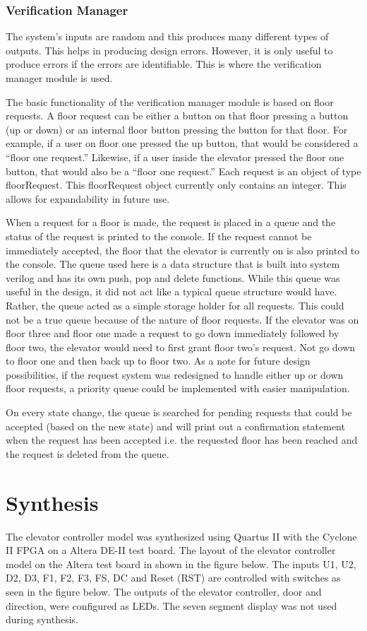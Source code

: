 \documentclass[journal]{IEEEtran}
\begin{document}
\subsubsection{Verification Manager}
The system’s inputs are random and this produces many different types of outputs. This helps in producing design errors. However, it is only useful to produce errors if the errors are identifiable. This is where the verification manager module is used.

The basic functionality of the verification manager module is based on floor requests. A floor request can be either a button on that floor pressing a button (up or down) or an internal floor button pressing the button for that floor. For example, if a user on floor one pressed the up button, that would be considered a “floor one request.” Likewise, if a user inside the elevator pressed the floor one button, that would also be a “floor one request.” Each request is an object of type floorRequest. This floorRequest object currently only contains an integer. This allows for expandability in future use.

When a request for a floor is made, the request is placed in a queue and the status of the request is printed to the console. If the request cannot be immediately accepted, the floor that the elevator is currently on is also printed to the console. The queue used here is a data structure that is built into system verilog and has its own push, pop and delete functions. While this queue was useful in the design, it did not act like a typical queue structure would have. Rather, the queue acted as a simple storage holder for all requests. This could not be a true queue because of the nature of floor requests. If the elevator was on floor three and floor one made a request to go down immediately followed by floor two, the elevator would need to first grant floor two’s request. Not go down to floor one and then back up to floor two. As a note for future design possibilities, if the request system was redesigned to handle either up or down floor requests, a priority queue could be implemented with easier manipulation.

On every state change, the queue is searched for pending requests that could be accepted (based on the new state) and will print out a confirmation statement when the request has been accepted i.e. the requested floor has been reached and the request is deleted from the queue.

\section{Synthesis}
The elevator controller model was synthesized using Quartus II with the Cyclone II FPGA  on a Altera DE-II test board. The layout of the elevator controller model on the Altera test board in shown in the figure below. The inputs U1, U2, D2, D3, F1, F2, F3, FS, DC and Reset (RST) are controlled with switches as seen in the figure below. The outputs of the elevator controller, door and direction, were configured as LEDs. The seven segment display was not used during synthesis. 
\end{document}
